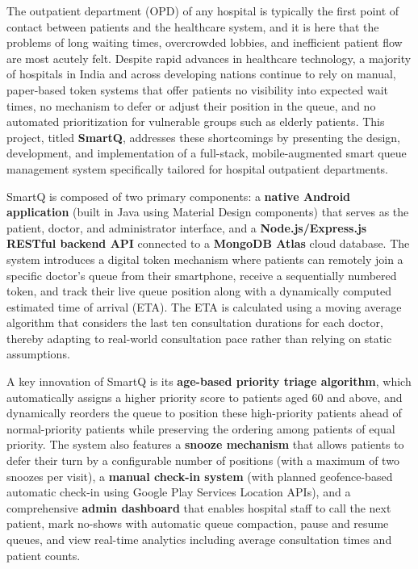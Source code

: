 \documentclass[12pt,a4paper]{article}
\begin{document}
The outpatient department (OPD) of any hospital is typically the first point of contact between patients and the healthcare system, and it is here that the problems of long waiting times, overcrowded lobbies, and inefficient patient flow are most acutely felt. Despite rapid advances in healthcare technology, a majority of hospitals in India and across developing nations continue to rely on manual, paper-based token systems that offer patients no visibility into expected wait times, no mechanism to defer or adjust their position in the queue, and no automated prioritization for vulnerable groups such as elderly patients. This project, titled \textbf{SmartQ}, addresses these shortcomings by presenting the design, development, and implementation of a full-stack, mobile-augmented smart queue management system specifically tailored for hospital outpatient departments.

SmartQ is composed of two primary components: a \textbf{native Android application} (built in Java using Material Design components) that serves as the patient, doctor, and administrator interface, and a \textbf{Node.js/Express.js RESTful backend API} connected to a \textbf{MongoDB Atlas} cloud database. The system introduces a digital token mechanism where patients can remotely join a specific doctor's queue from their smartphone, receive a sequentially numbered token, and track their live queue position along with a dynamically computed estimated time of arrival (ETA). The ETA is calculated using a moving average algorithm that considers the last ten consultation durations for each doctor, thereby adapting to real-world consultation pace rather than relying on static assumptions.

A key innovation of SmartQ is its \textbf{age-based priority triage algorithm}, which automatically assigns a higher priority score to patients aged 60 and above, and dynamically reorders the queue to position these high-priority patients ahead of normal-priority patients while preserving the ordering among patients of equal priority. The system also features a \textbf{snooze mechanism} that allows patients to defer their turn by a configurable number of positions (with a maximum of two snoozes per visit), a \textbf{manual check-in system} (with planned geofence-based automatic check-in using Google Play Services Location APIs), and a comprehensive \textbf{admin dashboard} that enables hospital staff to call the next patient, mark no-shows with automatic queue compaction, pause and resume queues, and view real-time analytics including average consultation times and patient counts.
\end{document}

